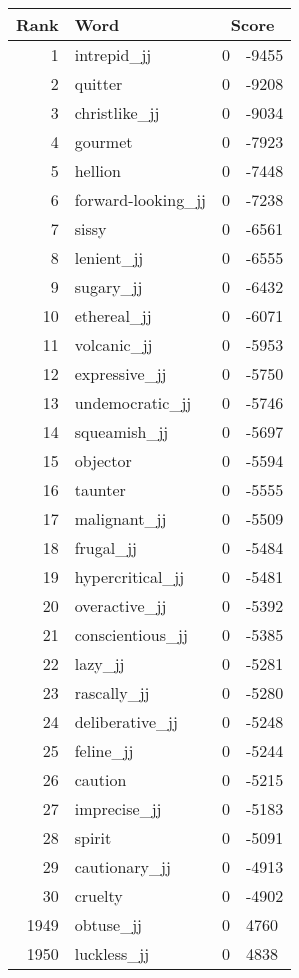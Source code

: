 \begin{longtable}[!htbp]{| rlr@{.}l |}
    \hline
    \textbf{Rank} & \textbf{Word} & \multicolumn{2}{c|}{\textbf{Score}} \\
    \hline
    \endhead
    1 & intrepid\_jj & 0 & -9455 \\
    2 & quitter & 0 & -9208 \\
    3 & christlike\_jj & 0 & -9034 \\
    4 & gourmet & 0 & -7923 \\
    5 & hellion & 0 & -7448 \\
    6 & forward-looking\_jj & 0 & -7238 \\
    7 & sissy & 0 & -6561 \\
    8 & lenient\_jj & 0 & -6555 \\
    9 & sugary\_jj & 0 & -6432 \\
    10 & ethereal\_jj & 0 & -6071 \\
    11 & volcanic\_jj & 0 & -5953 \\
    12 & expressive\_jj & 0 & -5750 \\
    13 & undemocratic\_jj & 0 & -5746 \\
    14 & squeamish\_jj & 0 & -5697 \\
    15 & objector & 0 & -5594 \\
    16 & taunter & 0 & -5555 \\
    17 & malignant\_jj & 0 & -5509 \\
    18 & frugal\_jj & 0 & -5484 \\
    19 & hypercritical\_jj & 0 & -5481 \\
    20 & overactive\_jj & 0 & -5392 \\
    21 & conscientious\_jj & 0 & -5385 \\
    22 & lazy\_jj & 0 & -5281 \\
    23 & rascally\_jj & 0 & -5280 \\
    24 & deliberative\_jj & 0 & -5248 \\
    25 & feline\_jj & 0 & -5244 \\
    26 & caution & 0 & -5215 \\
    27 & imprecise\_jj & 0 & -5183 \\
    28 & spirit & 0 & -5091 \\
    29 & cautionary\_jj & 0 & -4913 \\
    30 & cruelty & 0 & -4902 \\
    1949 & obtuse\_jj & 0 & 4760 \\
    1950 & luckless\_jj & 0 & 4838 \\

\end{longtable}
